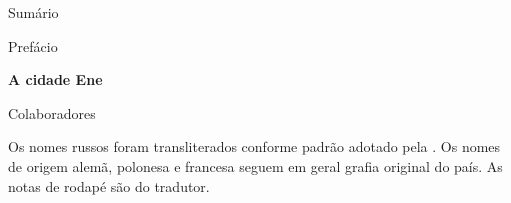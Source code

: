 \thispagestyle{empty}
\MyriadPro
Sumário

\hspace{2cm}{\Georgia{\pageref{prefacio}}} \hspace{.6cm} Prefácio 

\medskip

\hspace{2cm}{\Georgia{\pageref{cidade}}} \hspace{.4cm} \textbf{A cidade Ene} 

\medskip

\hspace{2cm}{\Georgia{\pageref{colaboradores}}} \hspace{.2cm} Colaboradores

\pagebreak
\thispagestyle{empty}

\begin{vplace}[30]
\begin{centering}
Os nomes russos foram transliterados conforme padrão adotado pela \scalebox{0.8}{USP}.
Os nomes de origem alemã, polonesa e francesa seguem em geral grafia original do país.
As notas de rodapé são do tradutor.
\end{centering}
\end{vplace}
\thispagestyle{empty}